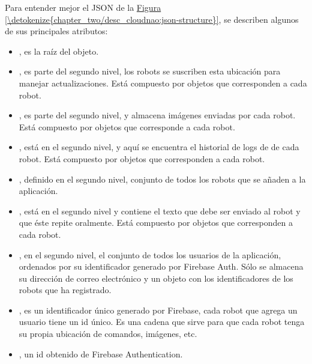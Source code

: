 Para entender mejor el JSON de la \hyperref[\detokenize{chapter_two/desc_cloudnao:json-structure}]{Figura \ref{\detokenize{chapter_two/desc_cloudnao:json-structure}}}, se describen
algunos de sus principales atributos:
\begin{itemize}
\item {} 
, es la raíz del objeto.

\item {} 
, es parte del segundo nivel, los robots se suscriben esta ubicación para manejar actualizaciones. Está compuesto por objetos que corresponden a cada robot.

\item {} 
, es parte del segundo nivel, y almacena imágenes enviadas por cada robot. Está compuesto por objetos que corresponde a cada robot.

\item {} 
, está en el segundo nivel, y aquí se encuentra el historial de logs de  de cada robot. Está compuesto por objetos que corresponden a cada robot.

\item {} 
, definido en el segundo nivel, conjunto de todos los robots que se añaden a la aplicación.

\item {} 
, está en el segundo nivel y contiene el texto que debe ser enviado al robot y que éste repite oralmente. Está compuesto por objetos que corresponden a cada robot.

\item {} 
, en el segundo nivel, el conjunto de todos los usuarios de la aplicación, ordenados por su identificador generado por Firebase Auth. Sólo se almacena su dirección de correo electrónico y un objeto con los identificadores de los robots que 
ha registrado.

\item {} 
, es un identificador único generado por Firebase, cada robot que agrega un usuario tiene un id único. Es una cadena que sirve para que cada robot tenga su propia ubicación de comandos, imágenes, etc.

\item {} 
, un id obtenido de Firebase Authentication.

\end{itemize}

